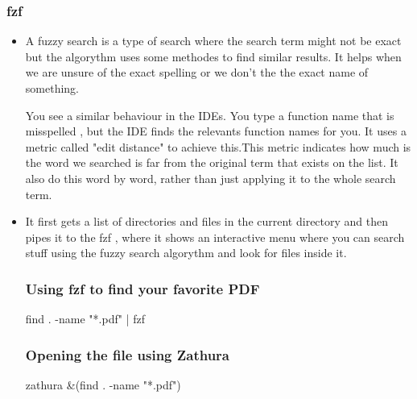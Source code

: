 \documentclass[titlepage]{article}
\begin{document}
\subsubsection{fzf}
\begin{itemize}
\item A fuzzy search is a type of search where the search term might not be exact but the algorythm uses some methodes to find similar results.
  It helps when we are unsure of the exact spelling or we don't the the exact name of something.

    You see a similar behaviour in the IDEs. You type a function name that is misspelled , but the IDE finds the relevants function names for you.
  It uses a metric called "edit distance" to achieve this.This metric indicates how much is the word we searched is far from the original term that exists on the list.
    It also do this word by word, rather than just applying it to the whole search term.
\item It first gets a list of directories and files in the current directory and then pipes it to the fzf , where it shows an interactive menu where you can search stuff using the fuzzy search algorythm and look for files inside it.
\subsubsection{Using fzf to find your favorite PDF}
    find . -name "*.pdf" | fzf
\subsubsection{Opening the file using Zathura}
    zathura &(find . -name "*.pdf")
   
\end{itemize}






  
\end{document}
